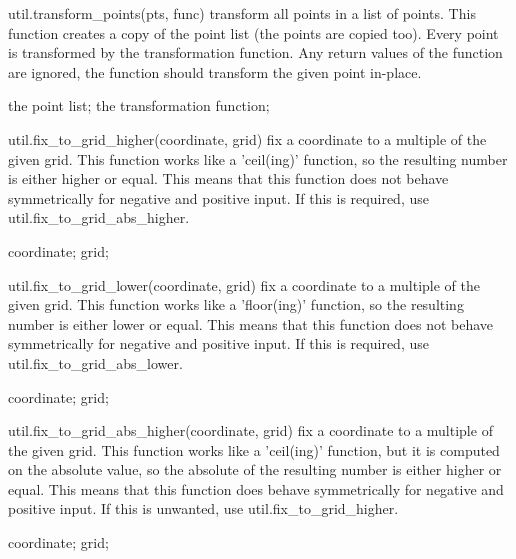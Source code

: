 \begin{APIfunc}{util.transform\_points(pts, func)}
    transform all points in a list of points. This function creates a copy of the point list (the points are copied too). Every point is transformed by the transformation function. Any return values of the function are ignored, the function should transform the given point in-place.
    \begin{APIparameters}
            the point list;
            the transformation function;
    \end{APIparameters}
\end{APIfunc}
\begin{APIfunc}{util.fix\_to\_grid\_higher(coordinate, grid)}
    fix a coordinate to a multiple of the given grid. This function works like a 'ceil(ing)' function, so the resulting number is either higher or equal. This means that this function does not behave symmetrically for negative and positive input. If this is required, use util.fix\_to\_grid\_abs\_higher.
    \begin{APIparameters}
            coordinate;
            grid;
    \end{APIparameters}
\end{APIfunc}
\begin{APIfunc}{util.fix\_to\_grid\_lower(coordinate, grid)}
    fix a coordinate to a multiple of the given grid. This function works like a 'floor(ing)' function, so the resulting number is either lower or equal. This means that this function does not behave symmetrically for negative and positive input. If this is required, use util.fix\_to\_grid\_abs\_lower.
    \begin{APIparameters}
            coordinate;
            grid;
    \end{APIparameters}
\end{APIfunc}
\begin{APIfunc}{util.fix\_to\_grid\_abs\_higher(coordinate, grid)}
    fix a coordinate to a multiple of the given grid. This function works like a 'ceil(ing)' function, but it is computed on the absolute value, so the absolute of the resulting number is either higher or equal. This means that this function does behave symmetrically for negative and positive input. If this is unwanted, use util.fix\_to\_grid\_higher.
    \begin{APIparameters}
            coordinate;
            grid;
    \end{APIparameters}
\end{APIfunc}
